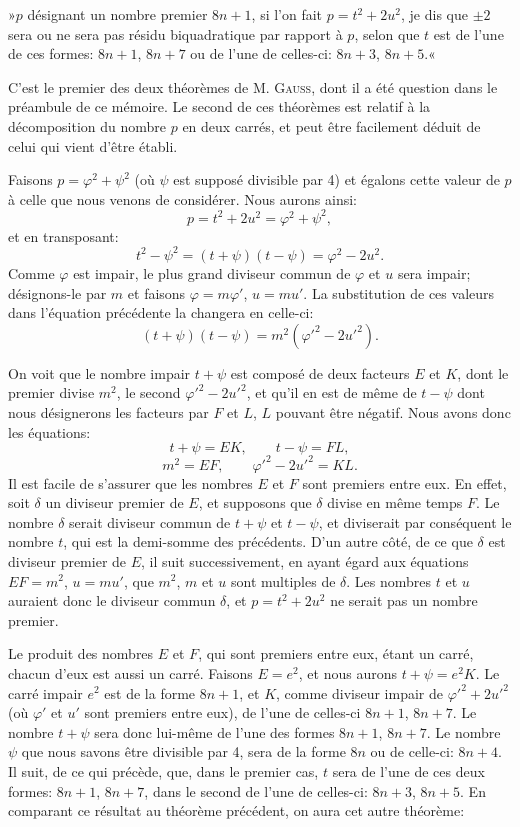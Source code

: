 \documentclass[11pt]{article}
\newcommand{\unitid}[1]{\hypertarget{#1}{}}
\begin{document}
\unitid{dirichlet.v1.p04a.thm.003}»$p$ désignant un nombre premier $8n+1$, si l'on fait $p=t^2+2u^2$, je dis que $\pm2$ sera ou ne sera pas résidu biquadratique par rapport à $p$, selon que $t$ est de l'une de ces formes: $8n+1$, $8n+7$ ou de l'une de celles-ci: $8n+3$, $8n+5$.«

\unitid{dirichlet.v1.p04a.par.012}C'est le premier des deux théorèmes de M. \textsc{Gauss}, dont il a été question dans le préambule de ce mémoire. Le second de ces théorèmes est relatif à la décomposition du nombre $p$ en deux carrés, et peut être facilement déduit de celui qui vient d'être établi.

\unitid{dirichlet.v1.p04a.par.013}Faisons $p=\varphi^2+\psi^2$ (où $\psi$ est supposé divisible par 4) et égalons cette valeur de $p$ à celle que nous venons de considérer. Nous aurons ainsi:
\[
 p=t^2+2u^2=\varphi^2+\psi^2,
\]
et en transposant:
\[
 t^2-\psi^2=(t+\psi)(t-\psi)=\varphi^2-2u^2.
\]
Comme $\varphi$ est impair, le plus grand diviseur commun de $\varphi$ et $u$ sera impair; désignons-le par $m$ et faisons $\varphi=m\varphi'$, $u=mu'$. La substitution de ces valeurs dans l'équation précédente la changera en celle-ci:
\[
 (t+\psi)(t-\psi)=m^2(\varphi'^2-2u'^2).
\]

\unitid{dirichlet.v1.p04a.par.014}On voit que le nombre impair $t+\psi$ est composé de deux facteurs $E$ et $K$, dont le premier divise $m^2$, le second $\varphi'^2-2u'^2$, et qu'il en est de même de $t-\psi$ dont nous désignerons les facteurs par $F$ et $L$, $L$ pouvant être négatif. Nous avons donc les équations:
\[
 t+\psi=EK,
\qquad t-\psi=FL,
\]
\[
 m^2=EF,
\qquad \varphi'^2-2u'^2=KL.
\]
Il est facile de s'assurer que les nombres $E$ et $F$ sont premiers entre eux. En effet, soit $\delta$ un diviseur premier de $E$, et supposons que $\delta$ divise en même temps $F$. Le nombre $\delta$ serait diviseur commun de $t+\psi$ et $t-\psi$, et diviserait par conséquent le nombre $t$, qui est la demi-somme des précédents. D'un autre côté, de ce que $\delta$ est diviseur premier de $E$, il suit successivement, en ayant égard aux équations $EF=m^2$, $u=mu'$, que $m^2$, $m$ et $u$ sont multiples de $\delta$. Les nombres $t$ et $u$ auraient donc le diviseur commun $\delta$, et $p=t^2+2u^2$ ne serait pas un nombre premier.

\unitid{dirichlet.v1.p04a.par.015}Le produit des nombres $E$ et $F$, qui sont premiers entre eux, étant un carré, chacun d'eux est aussi un carré. Faisons $E=e^2$, et nous aurons $t+\psi=e^2K$. Le carré impair $e^2$ est de la forme $8n+1$, et $K$, comme diviseur impair de $\varphi'^2+2u'^2$ (où $\varphi'$ et $u'$ sont premiers entre eux), de l'une de celles-ci $8n+1$, $8n+7$. Le nombre $t+\psi$ sera donc lui-même de l'une des formes $8n+1$, $8n+7$. Le nombre $\psi$ que nous savons être divisible par 4, sera de la forme $8n$ ou de celle-ci: $8n+4$. Il suit, de ce qui précède, que, dans le premier cas, $t$ sera de l'une de ces deux formes: $8n+1$, $8n+7$, dans le second de l'une de celles-ci: $8n+3$, $8n+5$. En comparant ce résultat au théorème précédent, on aura cet autre théorème:
\end{document}
